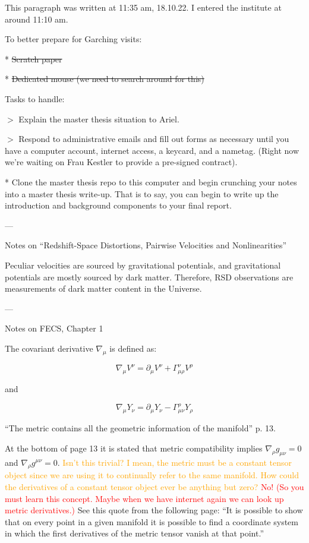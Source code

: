 \documentclass[11pt]{article}
\begin{document}
\fontsize{12}{15}

This paragraph was written at 11:35 am, 18.10.22. I entered the institute at around 11:10 am.

To better prepare for Garching visits:

* \sout{Scratch paper}

* \sout{Dedicated mouse (we need to search around for this)}

Tasks to handle:

$>$ Explain the master thesis situation to Ariel.

$>$ Respond to administrative emails and fill out forms as necessary until you have a computer account, internet access, a keycard, and a nametag. (Right now we're waiting on Frau Kestler to provide a pre-signed contract).

* Clone the master thesis repo to this computer and begin crunching your notes into a master thesis write-up. That is to say, you can begin to write up the introduction and background components to your final report.

---

Notes on ``Redshift-Space Distortions, Pairwise Velocities and Nonlinearities''

Peculiar velocities are sourced by gravitational potentials, and gravitational potentials are mostly sourced by dark matter. Therefore, RSD observations are measurements of dark matter content in the Universe.

---

Notes on FECS, Chapter 1

The covariant derivative $\nabla_\mu$ is defined as:

\begin{equation}
	\nabla_\mu V^\nu = \partial_\mu V^\nu + \Gamma^\nu_{\mu \rho} V^\rho
\end{equation}

and

\begin{equation}
	\nabla_\mu Y_\nu = \partial_\mu Y_\nu - \Gamma^\rho_{\mu \nu} Y_\rho
\end{equation}

``The metric contains all the geometric information of the manifold'' p. 13.

At the bottom of page 13 it is stated that metric compatibility implies $\nabla_\rho g_{\mu \nu} = 0$ and $\nabla_\rho  g^{\mu \nu} = 0$. \textcolor{orange}{Isn't this trivial? I mean, the metric must be a constant tensor object since we are using it to continually refer to the same manifold. How could the derivatives of a constant tensor object ever be anything but zero?} \textcolor{red}{No! (So you must learn this concept. Maybe when we have internet again we can look up metric derivatives.)} See this quote from the following page: ``It is possible to show that on every point in a given manifold it is possible to find a coordinate system in which the first derivatives of the metric tensor vanish at that point.''
\end{document}

